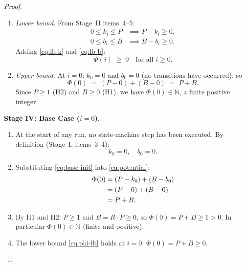 \documentclass[12pt]{article}
\theoremstyle{definition}
\begin{document}
\begin{proof}
\begin{enumerate}
  \item \emph{Lower bound.}  From Stage~II items~4--5:
        \begin{align}
          0 \leq k_i \leq P &\implies P - k_i \geq 0, \label{eq:lb-k}\\
          0 \leq b_i \leq B &\implies B - b_i \geq 0. \label{eq:lb-b}
        \end{align}
        Adding \eqref{eq:lb-k} and \eqref{eq:lb-b}:
        \begin{equation}
          \label{eq:phi-lb}
          \Phi(i) \;\geq\; 0 \quad \text{for all } i \geq 0.
        \end{equation}

  \item \emph{Upper bound.}  At $i = 0$: $k_0 = 0$ and $b_0 = 0$
        (no transitions have occurred), so
        \begin{equation}
          \label{eq:phi-ub}
          \Phi(0) \;=\; (P - 0) + (B - 0) \;=\; P + B.
        \end{equation}
        Since $P \geq 1$ (H2) and $B \geq 0$ (H1), we have
        $\Phi(0) \in \mathbb{N}$, a finite positive integer.
\end{enumerate}

\medskip
\noindent\textbf{Stage IV: Base Case ($i = 0$).}

\begin{enumerate}
  \item At the start of any run, no state-machine step has been
        executed.  By definition (Stage~I, items~3--4):
        \begin{equation}
          \label{eq:base-init}
          k_0 = 0, \quad b_0 = 0.
        \end{equation}

  \item Substituting \eqref{eq:base-init} into \eqref{eq:potential}:
        \begin{align}
          \Phi(0)
            &= (P - k_0) + (B - b_0) \notag\\
            &= (P - 0)   + (B - 0)   \notag\\
            &= P + B.     \label{eq:base-val}
        \end{align}

  \item By H1 and H2: $P \geq 1$ and $B = R \cdot P \geq 0$, so
        $\Phi(0) = P + B \geq 1 > 0$.  In particular
        $\Phi(0) \in \mathbb{N}$ (finite and positive).

  \item The lower bound \eqref{eq:phi-lb} holds at $i = 0$:
        $\Phi(0) = P + B \geq 0$. \checkmark
\end{enumerate}


\end{proof}
\end{document}
